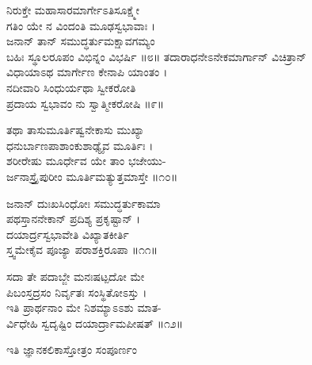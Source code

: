 ನಿರುಕ್ತೇ ಮಹಾಸಾರಮಾರ್ಗೇಽತಿಸೂಕ್ಷ್ಮೇ\\
ಗತಿಂ ಯೇ ನ ವಿಂದಂತಿ ಮೂಢಸ್ವಭಾವಾಃ ।\\
ಜನಾನ್ ತಾನ್ ಸಮುದ್ಧರ್ತುಮಕ್ಷಾವಗಮ್ಯಂ\\
ಬಹಿಃ ಸ್ಥೂಲರೂಪಂ ವಿಭಿನ್ನಂ ವಿಭರ್ಷಿ ॥೮॥
\eject
ತದಾರಾಧನೇಽನೇಕಮಾರ್ಗಾನ್ ವಿಚಿತ್ರಾನ್\\
ವಿಧಾಯಾಽಥ ಮಾರ್ಗೇಣ ಕೇನಾಪಿ ಯಾಂತಂ ।\\
ನದೀವಾರಿ ಸಿಂಧುರ್ಯಥಾ ಸ್ವೀಕರೋತಿ\\
ಪ್ರದಾಯ ಸ್ವಭಾವಂ ನು ಸ್ವಾತ್ಮೀಕರೋಷಿ ॥೯॥

ತಥಾ ತಾಸುಮೂರ್ತಿಷ್ವನೇಕಾಸು ಮುಖ್ಯಾ\\
ಧನುರ್ಬಾಣಪಾಶಾಂಕುಶಾಢ್ಯೈವ ಮೂರ್ತಿಃ ।\\
ಶರೀರೇಷು ಮೂರ್ಧೇವ ಯೇ ತಾಂ ಭಜೇಯು-\\
ರ್ಜನಾಸ್ತ್ರೈಪುರೀಂ ಮೂರ್ತಿಮತ್ಯುತ್ತಮಾಸ್ತೇ ॥೧೦॥

ಜನಾನ್ ದುಃಖಸಿಂಧೋಃ ಸಮುದ್ಧರ್ತುಕಾಮಾ\\
ಪಥಸ್ತಾನನೇಕಾನ್ ಪ್ರದಿಶ್ಯ ಪ್ರಕೃಷ್ಟಾನ್ ।\\
ದಯಾರ್ದ್ರಸ್ವಭಾವೇತಿ ವಿಖ್ಯಾತಕೀರ್ತಿ\\
ಸ್ತ್ವಮೇಕೈವ ಪೂಜ್ಯಾ ಪರಾಶಕ್ತಿರೂಪಾ ॥೧೧॥

ಸದಾ ತೇ ಪದಾಬ್ಜೇ ಮನಃಷಟ್ಪದೋ ಮೇ\\
ಪಿಬಂಸ್ತದ್ರಸಂ ನಿರ್ವೃತಃ ಸಂಸ್ಥಿತೋಽಸ್ತು ।\\
ಇತಿ ಪ್ರಾರ್ಥನಾಂ ಮೇ ನಿಶಮ್ಯಾಽಽಶು ಮಾತ-\\
ರ್ವಿಧೇಹಿ ಸ್ವದೃಷ್ಟಿಂ ದಯಾರ್ದ್ರಾಮಪೀಷತ್ ॥೧೨॥

\begin{center}{\Large ಇತಿ ಜ್ಞಾನಕಲಿಕಾಸ್ತೋತ್ರಂ ಸಂಪೂರ್ಣಂ}\end{center}
